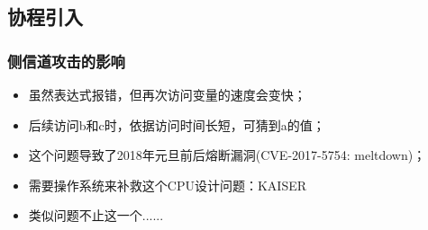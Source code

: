 \subsection{协程引入} %
\begin{frame}[fragile]
    \frametitle{侧信道攻击的影响}
	    \begin{itemize}
	        \item 虽然表达式报错，但再次访问变量的速度会变快；
	        \item 后续访问b和c时，依据访问时间长短，可猜到a的值； \pause
	        \item 这个问题导致了2018年元旦前后熔断漏洞(CVE-2017-5754: meltdown)； \pause
	        \item 需要操作系统来补救这个CPU设计问题：KAISER \pause
	        \item 类似问题不止这一个......
	    \end{itemize}
\end{frame}

